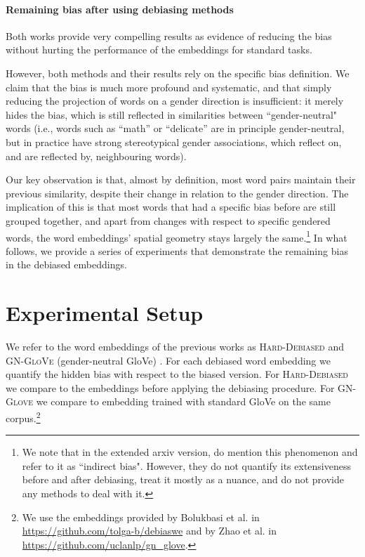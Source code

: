 \documentclass[11pt,a4paper]{article}
\begin{document}
	
	\paragraph{Remaining bias after using debiasing methods}
	
	Both works provide very compelling results as evidence of reducing the bias without hurting the performance of the embeddings for standard tasks. 
	
	However, both methods and their results rely on the specific bias definition. We claim that the bias is much more profound and systematic, and that simply reducing the projection of words on a gender direction is insufficient: it merely hides the bias, which is still reflected in similarities between ``gender-neutral" words (i.e., words such as ``math'' or ``delicate'' are in principle gender-neutral, but in practice have strong stereotypical gender associations, which reflect on, and are reflected by, neighbouring words). 
	
	Our key observation is that, almost by definition, most word pairs maintain their previous similarity, despite their change in relation to the gender direction. The implication of this is that most words that had a specific bias before are still grouped together, and apart from changes with respect to specific gendered words, the word embeddings' spatial geometry stays largely the same.\footnote{We note that in the extended arxiv version, \citet{BCZSK16} do mention this phenomenon and refer to it as ``indirect bias". However, they do not quantify its extensiveness before and after debiasing, treat it mostly as a nuance, and do not provide any methods to deal with it.}	
	In what follows, we provide a series of experiments that demonstrate the remaining bias in the debiased embeddings.
	
	\section{Experimental Setup}
	\label{experiments}
	
	We refer to the word embeddings of the previous works as \textsc{Hard-Debiased} \cite{BCZ16} and \textsc{GN-GloVe} (gender-neutral GloVe) \cite{ZZL18}. For each debiased word embedding we quantify the hidden bias with respect to the biased version. For \textsc{Hard-Debiased} we compare to the embeddings before applying the debiasing procedure. For \textsc{GN-Glove} we compare to embedding trained with standard GloVe on the same corpus.\footnote{We use the embeddings provided by Bolukbasi et al. \citeyearpar{BCZ16} in \url{https://github.com/tolga-b/debiaswe} and by Zhao et al. \citeyearpar{ZZL18} in \url{https://github.com/uclanlp/gn_glove}.}
	
\end{document}
